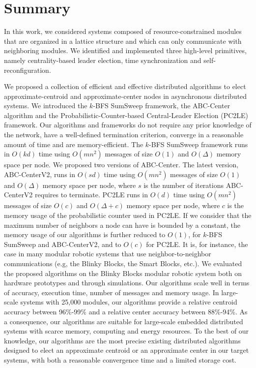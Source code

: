 \section{Summary}

In this work, we considered systems composed of resource-constrained modules that are organized in a lattice structure and which can only communicate with neighboring modules. We identified and implemented three high-level primitives, namely centrality-based leader election, time synchronization and self-reconfiguration.

We proposed a collection of efficient and effective distributed algorithms to elect approximate-centroid and approximate-center nodes in asynchronous distributed systems. We introduced the $k$-BFS SumSweep framework, the ABC-Center algorithm and the Probabilistic-Counter-based Central-Leader Election (PC2LE) framework. Our algorithms and frameworks do not require any prior knowledge of the network, have a well-defined termination criterion, converge in a reasonable amount of time and are memory-efficient. The $k$-BFS SumSweep framework runs in $O(kd)$ time using $O(mn^2)$ messages of size $O(1)$ and $O(\Delta)$ memory space per node. We proposed two versions of ABC-Center. The latest version, ABC-CenterV2, runs in $O(sd)$ time using $O(mn^2)$ messages of size $O(1)$ and $O(\Delta)$ memory space per node, where $s$ is the number of iterations ABC-CenterV2 requires to terminate. PC2LE runs in $O(d)$ time using $O(mn^2)$ messages of size $O(c)$ and $O(\Delta + c)$ memory space per node, where $c$ is the memory usage of the probabilistic counter used in PC2LE. If we consider that the maximum number of neighbors a node can have is bounded by a constant, the memory usage of our algorithms is further reduced to $O(1)$, for $k$-BFS SumSweep and ABC-CenterV2, and to $O(c)$ for PC2LE. It is, for instance, the case in many modular robotic systems that use neighbor-to-neighbor communications (e.g, the Blinky Blocks, the Smart Blocks, etc.). We evaluated the proposed algorithms on the Blinky Blocks modular robotic system both on hardware prototypes and through simulations. Our algorithms scale well in terms of accuracy, execution time, number of messages and memory usage. In large-scale systems with 25,000 modules, our algorithms provide a relative centroid accuracy between 96\%-99\% and a relative center accuracy between 88\%-94\%. As a consequence, our algorithms are suitable for large-scale embedded distributed systems with scarce memory, computing and energy resources. To the best of our knowledge, our algorithms are the most precise existing distributed algorithms designed to elect an approximate centroid or an approximate center in our target systems, with both a reasonable convergence time and a limited storage cost.

